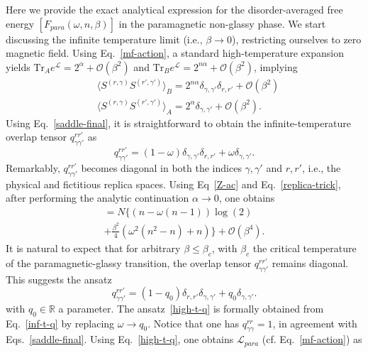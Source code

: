 \documentclass[twocolumn,superscriptaddress,prb,10pt]{revtex4-1}
\def\tr{\textrm{Tr}}
\begin{document}
Here we provide the exact analytical expression for the disorder-averaged free 
energy $[F_{para}(\omega,n,\beta)]$  in the paramagnetic non-glassy phase. 
We start discussing the infinite temperature limit (i.e., $\beta\to 0$), 
restricting ourselves to zero magnetic field. 
Using Eq.~\eqref{mf-action}, a standard high-temperature expansion yields 
$\tr_Ae^{{\mathcal L}}=2^{\alpha}+{\mathcal O}(\beta^2)$ and $\tr_B e^{{
\mathcal L}}=2^{n\alpha}+{\mathcal O}(\beta^2)$, implying  
%
\begin{align}
& \langle S^{(r,\gamma)}S^{(r',\gamma')}\rangle_B=2^{n\alpha}
\delta_{\gamma,\gamma'}\delta_{r,r'}+{\mathcal O}(\beta^2)\\
& \langle S^{(r,\gamma)}S^{(r',\gamma')}\rangle_A=2^{\alpha}
\delta_{\gamma,\gamma'}+{\mathcal O}(\beta^2).
\end{align}
%
Using Eq.~\eqref{saddle-final}, it is straightforward to obtain the 
infinite-temperature overlap tensor $q_{\gamma\gamma'}^{rr'}$ as 
%
\begin{equation}
q_{\gamma\gamma'}^{rr'}=(1-\omega)\delta_{\gamma,\gamma'}\delta_{r,r'}+
\omega\delta_{\gamma,\gamma'}.
\label{inf-t-q}
\end{equation}
%
Remarkably, $q_{\gamma\gamma'}^{rr'}$ becomes diagonal in both the 
indices $\gamma,\gamma'$ and $r,r'$, i.e., the physical and fictitious 
replica spaces. Using Eq~\eqref{Z-ac} and Eq.~\eqref{replica-trick}, 
after performing the analytic continuation $\alpha\to 0$, one obtains  
%
\begin{multline}
[F_{para}(\omega,n,\beta)]=N\Big\{(n-\omega(n-1))\log(2)\\
+\frac{\beta^2}{4}(\omega^2(n^2-n)+n)\Big\}+
{\mathcal O}(\beta^4).
\label{logZ-ht}
\end{multline}
% 
It is natural to expect that for arbitrary $\beta\le\beta_c$, with 
$\beta_c$ the critical temperature of the paramagnetic-glassy 
transition, the overlap tensor $q_{\gamma\gamma'}^{rr'}$ remains 
diagonal. This suggests the ansatz 
%
\begin{equation}
q_{\gamma\gamma'}^{rr'}=(1-q_0)\delta_{r,r'}\delta_{\gamma,\gamma'}+
q_0\delta_{\gamma,\gamma'}.
\label{high-t-q}
\end{equation}
%
with $q_0\in {\mathbb R}$ a parameter. The ansatz~\eqref{high-t-q} is formally 
obtained from Eq.~\eqref{inf-t-q} by replacing $\omega\to q_0$. Notice that 
one has $q_{\gamma\gamma}^{rr}=1$, in agreement with Eqs.~\eqref{saddle-final}. 
Using Eq.~\eqref{high-t-q}, one obtains ${\mathcal L}_{para}$ (cf. 
Eq.~\eqref{mf-action}) as   
\end{document}
